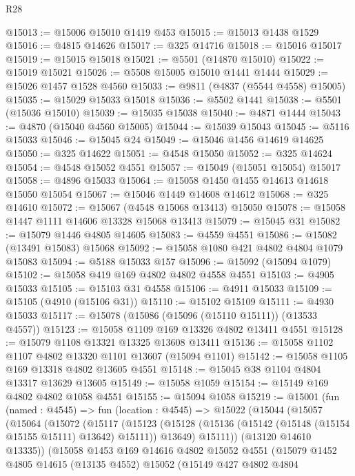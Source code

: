 \begin{lexlean}{R28}
\begin{coremodule}
@15013 := @15006 @15010 @1419 @453
@15015 := @15013 @1438 @1529
@15016 := @4815 @14626
@15017 := @325 @14716
@15018 := @15016 @15017
@15019 := @15015 @15018
@15021 := @5501 (@14870 @15010)
@15022 := @15019 @15021
@15026 := @5508 @15005 @15010 @1441 @1444
@15029 := @15026 @1457 @1528 @4560
@15033 := @9811 (@4837 (@5544 @4558) @15005)
@15035 := @15029 @15033 @15018
@15036 := @5502 @1441
@15038 := @5501 (@15036 @15010)
@15039 := @15035 @15038
@15040 := @4871 @1444
@15043 := @4870 (@15040 @4560 @15005)
@15044 := @15039 @15043
@15045 := @5116 @15033
@15046 := @15045 @24
@15049 := @15046 @1456 @14619 @14625
@15050 := @325 @14622
@15051 := @4548 @15050
@15052 := @325 @14624
@15054 := @4548 @15052 @4551
@15057 := @15049 (@15051 @15054) @15017
@15058 := @4896 @15033
@15064 := @15058 @1450 @1455 @14613 @14618 @15050 @15054
@15067 := @15046 @1449 @14608 @14612
@15068 := @325 @14610
@15072 := @15067 (@4548 @15068 @13413) @15050
@15078 := @15058 @1447 @1111 @14606 @13328 @15068 @13413
@15079 := @15045 @31
@15082 := @15079 @1446 @4805 @14605
@15083 := @4559 @4551
@15086 := @15082 (@13491 @15083) @15068
@15092 := @15058 @1080 @421 @4802 @4804 @1079 @15083
@15094 := @5188 @15033 @157
@15096 := @15092 (@15094 @1079)
@15102 := @15058 @419 @169 @4802 @4802 @4558 @4551
@15103 := @4905 @15033
@15105 := @15103 @31 @4558
@15106 := @4911 @15033
@15109 := @15105 (@4910 (@15106 @31))
@15110 := @15102 @15109
@15111 := @4930 @15033
@15117 := @15078 (@15086 (@15096 (@15110 @15111)) (@13533 @4557))
@15123 := @15058 @1109 @169 @13326 @4802 @13411 @4551
@15128 := @15079 @1108 @13321 @13325 @13608 @13411
@15136 := @15058 @1102 @1107 @4802 @13320 @1101 @13607 (@15094 @1101)
@15142 := @15058 @1105 @169 @13318 @4802 @13605 @4551
@15148 := @15045 @38 @1104 @4804 @13317 @13629 @13605
@15149 := @15058 @1059
@15154 := @15149 @169 @4802 @4802 @1058 @4551
@15155 := @15094 @1058
@15219 := @15001
    (fun (named : @4545) =>
    fun (location : @4545) =>
    @15022
      (@15044
        (@15057
          (@15064
            (@15072
              (@15117
                (@15123
                  (@15128 (@15136 (@15142 (@15148 (@15154 @15155 @15111) @13642) @15111)) @13649)
                  @15111))
              (@13120 @14610 @13335))
            (@15058
              @1453
              @169
              @14616
              @4802
              @15052
              @4551
              (@15079
                @1452
                @4805
                @14615
                (@13135 @4552)
                @15052
                (@15149
                  @427
                  @4802
                  @4804

\end{coremodule}
\end{lexlean}
